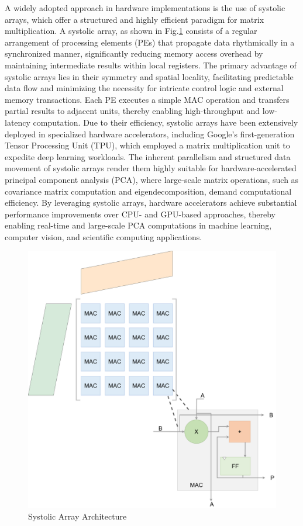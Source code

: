 A widely adopted approach in hardware implementations is the use of systolic arrays, which offer a structured and highly efficient paradigm for matrix multiplication\cite{mm-techniques-4}. A systolic array, as shown in Fig.\ref{fig:systolic-array} consists of a regular arrangement of processing elements (PEs) that propagate data rhythmically in a synchronized manner, significantly reducing memory access overhead by maintaining intermediate results within local registers. The primary advantage of systolic arrays lies in their symmetry and spatial locality, facilitating predictable data flow and minimizing the necessity for intricate control logic and external memory transactions. Each PE executes a simple MAC operation and transfers partial results to adjacent units, thereby enabling high-throughput and low-latency computation. Due to their efficiency, systolic arrays have been extensively deployed in specialized hardware accelerators, including Google’s first-generation Tensor Processing Unit (TPU), which employed a matrix multiplication unit to expedite deep learning workloads\cite{mm-techniques-5}. The inherent parallelism and structured data movement of systolic arrays render them highly suitable for hardware-accelerated principal component analysis (PCA), where large-scale matrix operations, such as covariance matrix computation and eigendecomposition, demand computational efficiency. By leveraging systolic arrays, hardware accelerators achieve substantial performance improvements over CPU- and GPU-based approaches, thereby enabling real-time and large-scale PCA computations in machine learning, computer vision, and scientific computing applications.

\begin{figure}
	\centerline{\includegraphics[scale = 0.15]{Figures/systolic_array_v2.png}}
	\caption{Systolic Array Architecture}
	\label{fig:systolic-array}
\end{figure}



